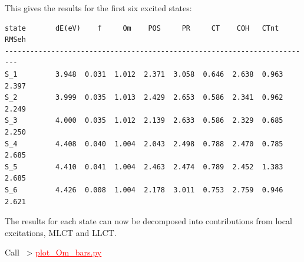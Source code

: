 \documentclass[DIV=12,headings=normal]{scrartcl}
\newcommand{\redl}[1]{{\textcolor{red}{\underline{#1}}}}
\newcommand{\comm}[1]{
\small
~> \redl{#1}
\normalsize
}
\begin{document}
This gives the results for the first six excited states:
\scriptsize
\begin{Verbatim}[commandchars=\\\{\}]
state       dE(eV)    f     Om    POS     PR     CT    COH   CTnt  RMSeh
-------------------------------------------------------------------------
S_1         3.948  0.031  1.012  2.371  3.058  0.646  2.638  0.963  2.397
S_2         3.999  0.035  1.013  2.429  2.653  0.586  2.341  0.962  2.249
S_3         4.000  0.035  1.012  2.139  2.633  0.586  2.329  0.685  2.250
S_4         4.408  0.040  1.004  2.043  2.498  0.788  2.470  0.785  2.685
S_5         4.410  0.041  1.004  2.463  2.474  0.789  2.452  1.383  2.685
S_6         4.426  0.008  1.004  2.178  3.011  0.753  2.759  0.946  2.621
\end{Verbatim}
\normalsize

The results for each state can now be decomposed into contributions from local excitations, MLCT and LLCT.

Call \comm{plot\_Om\_bars.py}
\end{document}
